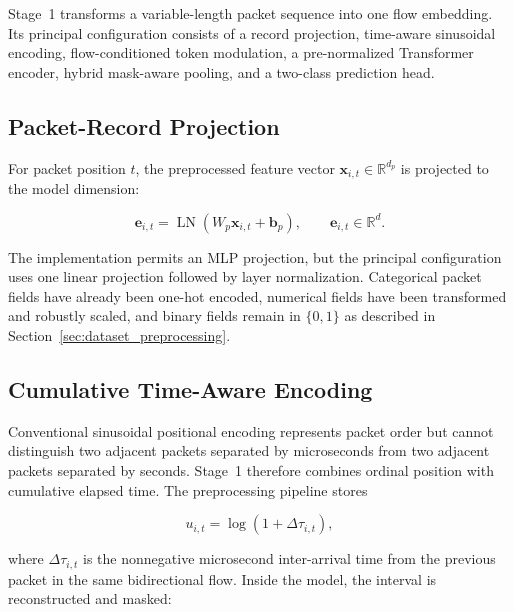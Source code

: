 \documentclass[11pt,fleqn]{report}
\begin{document}
Stage~1 transforms a variable-length packet sequence into one flow embedding.
Its principal configuration consists of a record projection, time-aware
sinusoidal encoding, flow-conditioned token modulation, a pre-normalized
Transformer encoder, hybrid mask-aware pooling, and a two-class prediction
head.

\subsection{Packet-Record Projection}
\label{subsubsec:packet_projection}

For packet position $t$, the preprocessed feature vector
$\mathbf{x}_{i,t}\in\mathbb{R}^{d_p}$ is projected to the model dimension:

\begin{equation}
    \mathbf{e}_{i,t}
    =\operatorname{LN}
    \left(W_p\mathbf{x}_{i,t}+\mathbf{b}_p\right),
    \qquad
    \mathbf{e}_{i,t}\in\mathbb{R}^{d}.
    \label{eq:record_projection}
\end{equation}

The implementation permits an MLP projection, but the principal configuration
uses one linear projection followed by layer normalization. Categorical packet
fields have already been one-hot encoded, numerical fields have been transformed
and robustly scaled, and binary fields remain in $\{0,1\}$ as described in
Section~\ref{sec:dataset_preprocessing}.

\subsection{Cumulative Time-Aware Encoding}
\label{subsubsec:time_aware_encoding}

Conventional sinusoidal positional encoding represents packet order but cannot
distinguish two adjacent packets separated by microseconds from two adjacent
packets separated by seconds. Stage~1 therefore combines ordinal position with
cumulative elapsed time. The preprocessing pipeline stores

\begin{equation}
    u_{i,t}=\log\left(1+\Delta\tau_{i,t}\right),
    \label{eq:stored_log_iat}
\end{equation}

where $\Delta\tau_{i,t}$ is the nonnegative microsecond inter-arrival time from
the previous packet in the same bidirectional flow. Inside the model, the
interval is reconstructed and masked:
\end{document}
